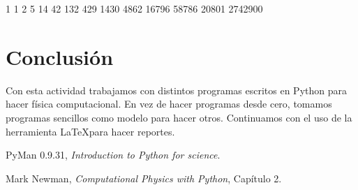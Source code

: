 \documentclass[12pt,spanish]{article}
\begin{document}
\begin{center}
 \begin{boxedverbatim}
1  1  2  5  14  42 132 429 1430 4862 16796 58786 20801 2742900
 \end{boxedverbatim}
\end{center}

\section*{Conclusión}
Con esta actividad trabajamos con distintos programas escritos en \mbox{Python} para hacer física computacional. En vez de hacer programas desde cero, tomamos programas sencillos como modelo para hacer otros. Continuamos con el uso de la herramienta \LaTeX para hacer reportes.

\begin{thebibliography}{9}

  PyMan 0.9.31,
  \emph{Introduction to Python for science}.
  
  Mark Newman,
  \emph{Computational Physics with Python},
  Capítulo 2.

\end{thebibliography}
\end{document}
